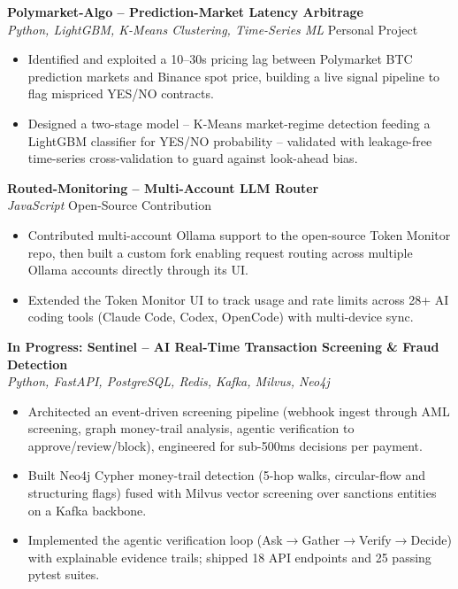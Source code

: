 \documentclass[letterpaper,11pt]{article}
\begin{document}
\vspace{1pt}
\textbf{Polymarket-Algo -- Prediction-Market Latency Arbitrage} \\
\hspace*{0.15in}\textit{Python, LightGBM, K-Means Clustering, Time-Series ML} \hfill Personal Project
\begin{itemize}[leftmargin=0.32in,labelsep=0.45em,itemsep=2pt,topsep=2pt,partopsep=0pt,parsep=0pt]
  \item Identified and exploited a 10--30s pricing lag between Polymarket BTC prediction markets
        and Binance spot price, building a live signal pipeline to flag mispriced YES/NO contracts.
  \item Designed a two-stage model -- K-Means market-regime detection feeding a LightGBM classifier
        for YES/NO probability -- validated with leakage-free time-series cross-validation to
        guard against look-ahead bias.
\end{itemize}

\vspace{1pt}
\textbf{Routed-Monitoring -- Multi-Account LLM Router} \\
\hspace*{0.15in}\textit{JavaScript} \hfill Open-Source Contribution
\begin{itemize}[leftmargin=0.32in,labelsep=0.45em,itemsep=2pt,topsep=2pt,partopsep=0pt,parsep=0pt]
  \item Contributed multi-account Ollama support to the open-source Token Monitor repo, then built
        a custom fork enabling request routing across multiple Ollama accounts directly through
        its UI.
  \item Extended the Token Monitor UI to track usage and rate limits across 28+ AI coding tools
        (Claude Code, Codex, OpenCode) with multi-device sync.
\end{itemize}

\vspace{1pt}
\textbf{In Progress: Sentinel -- AI Real-Time Transaction Screening \& Fraud Detection} \\
\hspace*{0.15in}\textit{Python, FastAPI, PostgreSQL, Redis, Kafka, Milvus, Neo4j}
\begin{itemize}[leftmargin=0.32in,labelsep=0.45em,itemsep=2pt,topsep=2pt,partopsep=0pt,parsep=0pt]
  \item Architected an event-driven screening pipeline (webhook ingest through AML screening,
        graph money-trail analysis, agentic verification to approve/review/block), engineered
        for sub-500ms decisions per payment.
  \item Built Neo4j Cypher money-trail detection (5-hop walks, circular-flow and structuring flags)
        fused with Milvus vector screening over sanctions entities on a Kafka backbone.
  \item Implemented the agentic verification loop (Ask$\to$Gather$\to$Verify$\to$Decide) with explainable
        evidence trails; shipped 18 API endpoints and 25 passing pytest suites.
\end{itemize}
\end{document}
